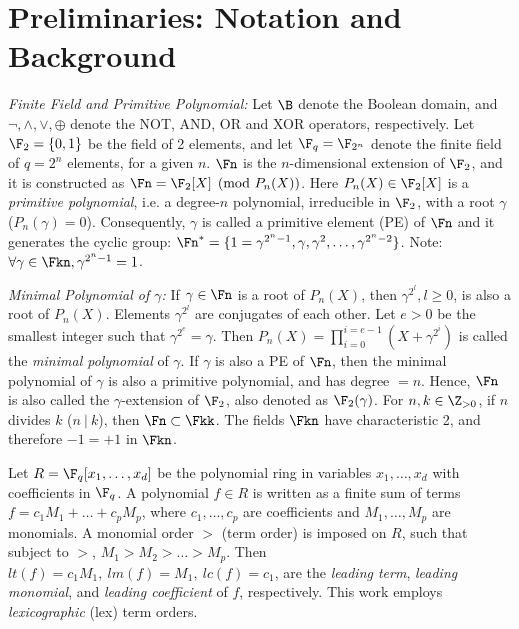 \section{Preliminaries: Notation and Background}\label{sec:prelim}
{\it Finite Field and Primitive Polynomial:} Let $\B$ denote the
Boolean domain, and $\neg, \wedge,\vee, \oplus$ denote the
NOT, AND, OR and XOR operators, respectively. Let $\F_2=\{0,1\}$
be the field of 2 elements, and let $\F_q = \F_{2^n}$ denote the finite
field of $q=2^n$ elements, for a given $n$. $\Fn$ is the
$n$-dimensional extension of $\F_2$, and it is constructed as $\Fn =
\F_2[X]\pmod{ P_n(X)}$. Here $P_n(X) \in \F_2[X]$ is a {\it primitive
  polynomial}, i.e. a degree-$n$ polynomial, irreducible in
$\F_2$, with a root $\gamma$ ($P_n(\gamma)=0$). 
Consequently, $\gamma$ is called a primitive element (PE) of $\Fn$ and
it generates the cyclic group: $\Fn^*=\{1=\gamma^{2^n - 1}, \gamma,
\gamma^2,\dots,\gamma^{2^n - 2}\}$. Note: $\forall \gamma\in \Fkn, \gamma^{2^n-1}=1$.

{\it Minimal Polynomial of $\gamma$:} If $\gamma \in \Fn$ is a root
of $P_n(X)$, then $\gamma^{2^l},l\geq 0$, is also a root of
$P_n(X)$. Elements $\gamma^{2^l}$ are conjugates of each other. Let
$e>0$ be the smallest integer such that $\gamma^{2^e} = \gamma$. Then
$P_n(X)=\prod_{i=0}^{i=e-1}(X+\gamma^{2^i})$ is called the {\it
  minimal polynomial} of $\gamma$. If $\gamma$ is also a PE of $\Fn$,
then the minimal polynomial of $\gamma$ is also a primitive
polynomial, and has degree $=n$. Hence, $\Fn$ is also called the
$\gamma$-extension of $\F_2$, also denoted as $\F_2(\gamma)$. 
For $n, k \in \Z_{> 0}$, if $n$ divides $k$ ($n ~|~ k$), then $\Fn \subset
\Fkk$. 
The fields $\Fkn$ have
characteristic 2, and therefore $-1 = +1$ in $\Fkn$. 


Let $R=\F_q[x_1,\dots,x_d]$ be the  polynomial ring in variables
$x_1,\dots,x_d$ with coefficients in $\F_q$. A polynomial $f \in R$ is 
written as a finite sum of terms  $f = c_1 M_1 +  \dots +
c_p M_p$, where $c_1, \dots, c_p$ are coefficients and $M_1, \dots,
M_p$ are monomials.
A monomial order $>$ (term order) is imposed on $R$, such that subject to
$>$, $M_1 >M_2 > \dots > M_p$. Then $lt(f) = c_1 M_1, ~lm(f) = M_1,
~lc(f) = c_1$, are the {\it leading   term}, {\it   leading monomial}, 
and {\it   leading coefficient} of $f$, respectively. This work employs {\it lexicographic}
(lex) term orders.  

